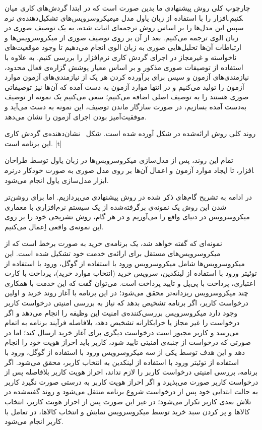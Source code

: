 
\label{فصل:روش پیشنهادی}

چارچوب کلی روش پیشنهادی ما بدین صورت است که در ابتدا گردش‌های کاری میان میکروسرویس‌های تشکیل‌دهنده‌ی نرم‎افزار را با استفاده از زبان یاول مدل می‎کنیم. سپس این مدل‌ها را بر اساس روش ترجمه‌ای اثبات شده، به یک توصیف صوری در زبان الوی ترجمه می‌کنیم. بعد از آن بر روی توصیف صوری از میکروسرویس‌ها و ارتباطات آن‌ها تحلیل‌هایی صوری به زبان الوی انجام می‌دهیم تا وجود موقعیت‌های ناخواسته و غیرمجاز در اجرای گردش کاری نرم‌افزار را بررسی کنیم. به علاوه با استفاده از توصیفات صوری مذکور و بر اساس معیار پوشش گزاره‌ی فعال محدود، نیازمندی‌های آزمون و سپس برای برآورده کردن هر یک از نیازمندی‌های آزمون موارد آزمون را تولید می‌کنیم و در انتها موارد آزمون به دست آمده که آن‌ها نیز توصیفاتی صوری هستند را به توصیف اصلی اضافه می‌کنیم؛ سعی می‌کنیم یک نمونه از توصیف به‌دست آمده بسازیم، در صورت سازگار ماندن توصیف، این نمونه به دست می‌آید و موفقیت‌آمیز بودن اجرای آزمون را نشان می‌دهد. 

روند کلی روش ارائه‌شده در شکل آورده شده است.
شکل~ نشان‌دهنده‌ی گردش کاری این برنامه است.
[t]
\vspace{0.3em}

تمام این روند، پس از مدل‌سازی میکروسرویس‌ها در زبان یاول توسط طراحان نرم‎افزار، تا ایجاد موارد آزمون و اعمال آن‌ها بر روی مدل صوری به صورت خودکار در ابزار مدل‌سازی یاول انجام می‌شود.

در ادامه به تشریح گام‌های ذکر شده در روش پیشنهادی می‌پردازیم. اما برای روشن‌تر شدن این روش یک نمونه‌‌ی برگرفته‌شده از یک سیستم نرم‌افزاری با معماری میکروسرویس در دنیای واقع را می‌آوریم و در هر گام، روش تشریحی خود را بر روی این نمونه‌ی واقعی اِعمال می‌کنیم. 

نمونه‌ای که گفته ‌خواهد شد، یک برنامه‌ی خرید به صورت برخط است که از میکروسرویس‌های مستقل برای ارائه‌ی خدمت خود تشکیل شده‌ است. این میکروسرویس‌ها شامل میکروسرویس ورود با استفاده از گوگل، ورود با استفاده از توئیتر ورود با استفاده از لینکدین، سرویس خرید (انتخاب موارد خرید)، پرداخت با کارت اعتباری، پرداخت با پی‌پل و تایید پرداخت است. می‌توان گفت که این خدمت با همکاری چند میکروسرویس ریزدانه‌تر محقق می‌شود؛ در این برنامه با آغاز روند خرید و اولین درخواست کاربر، اگر برنامه تشخیص بدهد که  نیاز به بررسی امنیتی درخواست کاربر وجود دارد میکروسرویس بررسی‌کننده‌ی امنیت این وظیفه را انجام می‌دهد و اگر درخواست را غیر مجاز یا خرابکارانه تشخیص دهد، بلافاصله فرآیند برنامه به اتمام می‌رسد و کاربر مجبور است درخواست دیگری برای آغاز خرید ارسال کند؛ اما در صورتی که درخواست از جنبه‌ی امنیتی تایید شود، کاربر باید احراز هویت خود را انجام دهد و این هدف توسط یکی از سه میکروسرویس ورود با استفاده از گوگل، ورود با استفاده از توئیتر ورود با استفاده از لینکدین به انتخاب کاربر، محقق می‌شود. اگر برنامه، بررسی امنیتی درخواست کاربر را لازم نداند، احراز هویت کاربر بلافاصله پس از درخواست کاربر صورت می‌پذیرد و اگر احراز هویت کاربر به درستی صورت نگیرد کاربر به حالت ابتدایی خود پس از درخواست شروع برنامه منتقل می‌شود و روند گفته‌‌شده در تلاش بعدی کاربر تکرار می‌شود؛ در غیر این صورت پس از احراز هویت کاربر، انتخاب کالاها و پر کردن سبد خرید توسط میکروسرویس نمایش و انتخاب کالاها، در تعامل با کاربر انجام می‌شود. 

